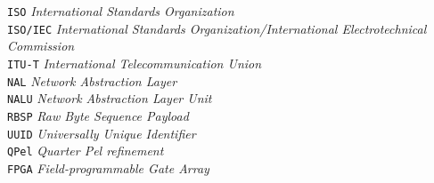 \verb"ISO" \dotfill \textit{International Standards Organization}\\
\verb"ISO/IEC" \dotfill \textit{International Standards Organization/International Electrotechnical Commission}\\
\verb"ITU-T" \dotfill \textit{International Telecommunication Union}\\
\verb"NAL" \dotfill \textit{Network Abstraction Layer}\\
\verb"NALU" \dotfill \textit{Network Abstraction Layer Unit}\\
\verb"RBSP" \dotfill \textit{Raw Byte Sequence Payload}\\
\verb"UUID" \dotfill \textit{Universally Unique Identifier}\\
\verb"QPel" \dotfill \textit{Quarter Pel refinement}\\
\verb"FPGA" \dotfill \textit{Field-programmable Gate Array}\\
